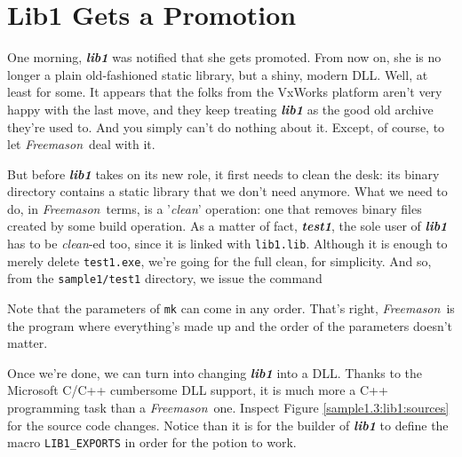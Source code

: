 \documentclass[a4paper]{article}
\newcommand{\freemason}{\textit{Freemason}}
\newcommand{\nameb}[1]{\textbf{\emph{#1}}}
\newcommand{\concept}[1]{\textit{#1}}
\begin{document}
\newpage
\section{Lib1 Gets a Promotion}

One morning, \nameb{lib1} was notified that she gets promoted. From now on, she is no longer a
plain old-fashioned static library, but a shiny, modern DLL. Well, at least for some. It appears
that the folks from the VxWorks platform aren't very happy with the last move, and they keep
treating \nameb{lib1} as the good old archive they're used to. And you simply can't do nothing
about it. Except, of course, to let \freemason\ deal with it.
\par
But before \nameb{lib1} takes on its new role, it first needs to clean the desk: its binary directory
contains a static library that we don't need anymore. What we need to do, in \freemason\ terms,
is a '\concept{clean}' operation: one that removes binary files created by some build operation.
As a matter of fact, \nameb{test1}, the sole user of \nameb{lib1} has to be \concept{clean}-ed too, since
it is linked with \verb"lib1.lib". Although it is enough to merely delete \verb"test1.exe", we're going for the
full clean, for simplicity. And so, from the \verb"sample1/test1" directory, we issue the command
\begin{center}
\end{center}
\par
Note that the parameters of \verb"mk" can come in any order. That's right, \freemason\ is the program
where everything's made up and the order of the parameters doesn't matter.
\par
Once we're done, we can turn into changing \nameb{lib1} into a DLL. Thanks to the Microsoft C/C++ cumbersome
DLL support, it is much more a C++ programming task than a \freemason\ one. Inspect Figure \ref{sample1.3:lib1:sources}
for the source code changes. Notice than it is for the builder of \nameb{lib1} to define the macro \verb"LIB1_EXPORTS"
in order for the potion to work.
\end{document}

